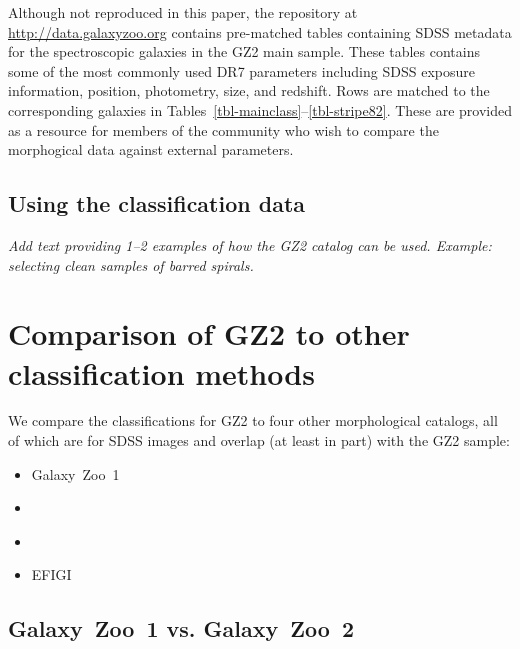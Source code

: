 \documentclass[useAMS,usenatbib]{mn2e}
\begin{document}
Although not reproduced in this paper, the repository at \url{http://data.galaxyzoo.org} contains pre-matched tables containing SDSS metadata for the spectroscopic galaxies in the GZ2 main sample. These tables contains some of the most commonly used DR7 parameters including SDSS exposure information, position, photometry, size, and redshift. Rows are matched to the corresponding galaxies in Tables~\ref{tbl-mainclass}--\ref{tbl-stripe82}. These are provided as a resource for members of the community who wish to compare the morphogical data against external parameters. 

\subsection{Using the classification data}\label{ssec-usingdata}

{\it Add text providing 1--2 examples of how the GZ2 catalog can be used. Example: selecting clean samples of barred spirals.}


\section{Comparison of GZ2 to other classification methods}\label{sec-comparison}

We compare the classifications for GZ2 to four other morphological catalogs, all of which are for SDSS images and overlap (at least in part) with the GZ2 sample:

\begin{itemize}
	\item Galaxy~Zoo~1 \citep{lin11}
	\item \citet{nai10}
	\item \citet{hue11}
	\item EFIGI \citep{bai11}
\end{itemize}


\subsection{Galaxy~Zoo~1 vs. Galaxy~Zoo~2}
\end{document}
